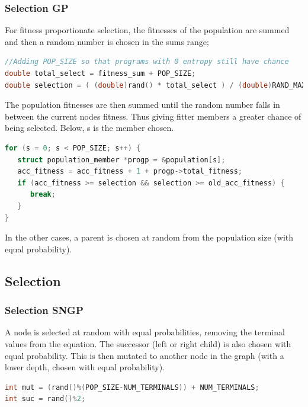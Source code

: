 \documentclass{beamer}
\begin{document}
\begin{frame}[fragile]
\frametitle{Selection GP}
For fitness proportionate selection, the fitnesses of the population are summed and then a random number is chosen in the sums range;
\begin{lstlisting}[language=C, basicstyle=\tiny]
//Adding POP_SIZE so that programs with 0 entropy still have chance
double total_select = fitness_sum + POP_SIZE; 
double selection = ( (double)rand() * total_select ) / (double)RAND_MAX;
\end{lstlisting}

The population fitnesses are then summed until the random number falls in between the current nodes fitness. Thus giving fitter members a greater chance of being selected. Below, s is the member chosen.

\begin{lstlisting}[language=C, basicstyle=\tiny]
for (s = 0; s < POP_SIZE; s++) {
   struct population_member *progp = &population[s];
   acc_fitness = acc_fitness + 1 + progp->total_fitness;
   if (acc_fitness >= selection && selection >= old_acc_fitness) {
      break;
   }
}
\end{lstlisting}
In the other cases, a parent is chosen at random from the population size (with equal probability).
\end{frame}


\subsection{Selection}
\begin{frame}[fragile]
\frametitle{Selection SNGP}

A node is selected at random with equal probabilities, removing the terminal values from the equation. The successor (left or right child) is also chosen with equal probability. This is then mutated to another node in the graph (with a lower depth, chosen with equal probability).\newline

\begin{lstlisting}[language=C, basicstyle=\scriptsize]
int mut = (rand()%(POP_SIZE-NUM_TERMINALS)) + NUM_TERMINALS;
int suc = rand()%2;
\end{lstlisting}
\end{frame}
\end{document}

